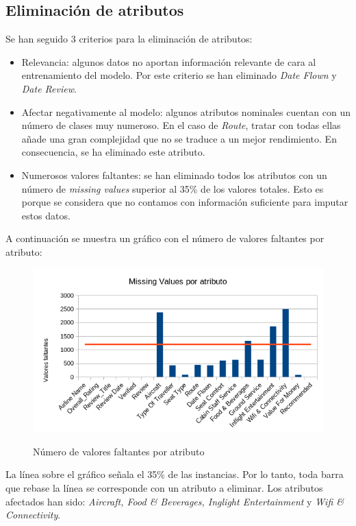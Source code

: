 \documentclass[es]{uc3mreport}
\begin{document}
\begin{report}
\subsection{Eliminación de atributos}
\label{sec:delete_columns}
Se han seguido 3 criterios para la eliminación de atributos:
\begin{itemize}
    \item Relevancia: algunos datos no aportan información relevante de cara al entrenamiento del modelo. Por este criterio se han eliminado \textit{Date Flown} y \textit{Date Review}.
    \item Afectar negativamente al modelo: algunos atributos nominales cuentan con un número de clases muy numeroso. En el caso de \textit{Route}, tratar con todas ellas añade una gran complejidad que no se traduce a un mejor rendimiento. En consecuencia, se ha eliminado este atributo.
    \item Numerosos valores faltantes: se han eliminado todos los atributos con un número de \textit{missing values} superior al 35\% de los valores totales. Esto es porque se considera que no contamos con información suficiente para imputar estos datos.
\end{itemize}
A continuación se muestra un gráfico con el número de valores faltantes por atributo:

\begin{figure}[H]
    \center
    \includegraphics[width=0.85\linewidth]{missings.png}\\
    \caption{Número de valores faltantes por atributo}
\end{figure}

La línea sobre el gráfico señala el 35\% de las instancias. Por lo tanto, toda barra que rebase la línea se corresponde con un atributo a eliminar. Los atributos afectados han sido: \textit{Aircraft, Food \& Beverages, Inglight Entertainment} y \textit{Wifi \& Connectivity}.


\end{report}
\end{document}
